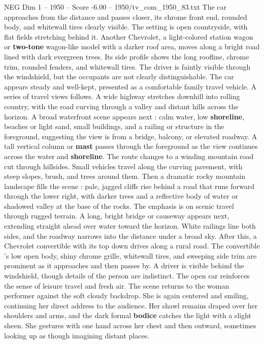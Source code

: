 \begin{textsample}{NEG Dim 1 – 1950 – Score -6.00 – 1950/tv\_com\_1950\_83.txt}
The car approaches from the distance and passes closer, its chrome front end, rounded body, and whitewall tires clearly visible.
The setting is open countryside, with flat fields stretching behind it.
Another Chevrolet, a light-colored station wagon or \textbf{two-tone} wagon-like model with a darker roof area, moves along a bright road lined with dark evergreen trees.
Its side profile shows the long roofline, chrome trim, rounded fenders, and whitewall tires.
The driver is faintly visible through the windshield, but the occupants are not clearly distinguishable.
The car appears steady and well-kept, presented as a comfortable family travel vehicle.
A series of travel views follows.
A wide highway stretches downhill into rolling country, with the road curving through a valley and distant hills across the horizon.
A broad waterfront scene appears next : calm water, low \textbf{shoreline}, beaches or light sand, small buildings, and a railing or structure in the foreground, suggesting the view is from a bridge, balcony, or elevated roadway.
A tall vertical column or \textbf{mast} passes through the foreground as the view continues across the water and \textbf{shoreline}.
The route changes to a winding mountain road cut through hillsides.
Small vehicles travel along the curving pavement, with steep slopes, brush, and trees around them.
Then a dramatic rocky mountain landscape fills the scene : pale, jagged cliffs rise behind a road that runs forward through the lower right, with darker trees and a reflective body of water or shadowed valley at the base of the rocks.
The emphasis is on scenic travel through rugged terrain.
A long, bright bridge or causeway appears next, extending straight ahead over water toward the horizon.
White railings line both sides, and the roadway narrows into the distance under a broad sky.
After this, a Chevrolet convertible with its top down drives along a rural road.
The convertible ’s low open body, shiny chrome grille, whitewall tires, and sweeping side trim are prominent as it approaches and then passes by.
A driver is visible behind the windshield, though details of the person are indistinct.
The open car reinforces the sense of leisure travel and fresh air.
The scene returns to the woman performer against the soft cloudy backdrop.
She is again centered and smiling, continuing her direct address to the audience.
Her shawl remains draped over her shoulders and arms, and the dark formal \textbf{bodice} catches the light with a slight sheen.
She gestures with one hand across her chest and then outward, sometimes looking up as though imagining distant places.

\end{textsample}
